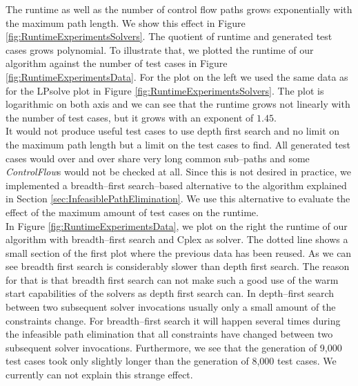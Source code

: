 \documentclass[runningheads,a4paper]{llncs}%
\newcommand{\UMLType}[1]{\textsf{\textit{#1}}} %
\begin{document}
The runtime as well as the number of control flow paths grows exponentially with the maximum path length. We show this effect in Figure \ref{fig:RuntimeExperimentsSolvers}. The quotient of runtime and generated test cases grows polynomial. 
To illustrate that, we plotted the runtime of our algorithm against the number of test cases in Figure \ref{fig:RuntimeExperimentsData}. For the plot on the left we used the same data as for the LPsolve plot in Figure \ref{fig:RuntimeExperimentsSolvers}. The plot is logarithmic on both axis and we can see that the runtime grows not linearly with the number of test cases, but it grows with an exponent of $1.45$.\\
It would not produce useful test cases to use depth first search and no limit on the maximum path length but a limit on the test cases to find. All generated test cases would over and over share very long common sub--paths and some \UMLType{ControlFlow}s would not be checked at all. Since this is not desired in practice, we implemented a breadth--first search--based alternative to the algorithm explained in Section \ref{sec:InfeasiblePathElimination}. We use this alternative to evaluate the effect of the maximum amount of test cases on the runtime.\\
In Figure \ref{fig:RuntimeExperimentsData}, we plot on the right the runtime of our algorithm with breadth--first search and Cplex as solver. The dotted line shows a small section of the first plot where the previous data has been reused. As we can see breadth first search is considerably slower than depth first search. The reason for that is that breadth first search can not make such a good use of the warm start capabilities of the solvers as depth first search can. In depth--first search between two subsequent solver invocations usually only a small amount of the constraints change. For breadth--first search it will happen several times during the infeasible path elimination that all constraints have changed between two subsequent solver invocations. Furthermore, we see that the generation of 9,000 test cases took only slightly longer than the generation of 8,000 test cases. We currently can not explain this strange effect.
\end{document}
